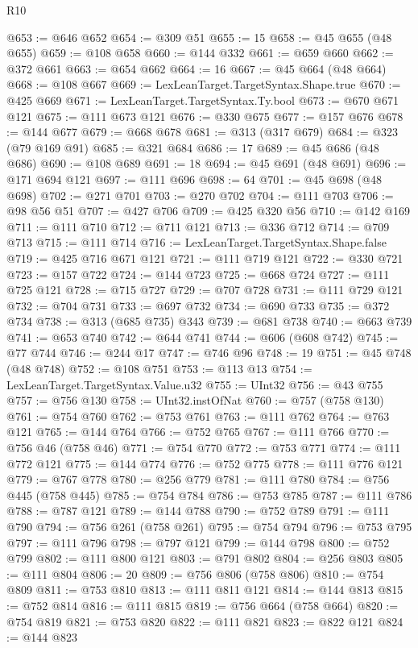 \begin{lexlean}{R10}
\begin{coremodule}
{{{{{{{{{{{{{{{{{{{{{{{{{{{{{{{{{{{{{{{{{{{{{{{{{{{{{{{{{{{{{{{{{{{{{{{{{{{{{{{{{{{{{{{{{{{{{{{{{{{{{{{{{{{{@653 := @646 @652
@654 := @309 @51
@655 := 15
@658 := @45 @655 (@48 @655)
@659 := @108 @658
@660 := @144 @332
@661 := @659 @660
@662 := @372 @661
@663 := @654 @662
@664 := 16
@667 := @45 @664 (@48 @664)
@668 := @108 @667
@669 := LexLeanTarget.TargetSyntax.Shape.true
@670 := @425 @669
@671 := LexLeanTarget.TargetSyntax.Ty.bool
@673 := @670 @671 @121
@675 := @111 @673 @121
@676 := @330 @675
@677 := @157 @676
@678 := @144 @677
@679 := @668 @678
@681 := @313 (@317 @679)
@684 := @323 (@79 @169 @91)
@685 := @321 @684
@686 := 17
@689 := @45 @686 (@48 @686)
@690 := @108 @689
@691 := 18
@694 := @45 @691 (@48 @691)
@696 := @171 @694 @121
@697 := @111 @696
@698 := 64
@701 := @45 @698 (@48 @698)
@702 := @271 @701
@703 := @270 @702
@704 := @111 @703
@706 := @98 @56 @51
@707 := @427 @706
@709 := @425 @320 @56
@710 := @142 @169
@711 := @111 @710
@712 := @711 @121
@713 := @336 @712
@714 := @709 @713
@715 := @111 @714
@716 := LexLeanTarget.TargetSyntax.Shape.false
@719 := @425 @716 @671 @121
@721 := @111 @719 @121
@722 := @330 @721
@723 := @157 @722
@724 := @144 @723
@725 := @668 @724
@727 := @111 @725 @121
@728 := @715 @727
@729 := @707 @728
@731 := @111 @729 @121
@732 := @704 @731
@733 := @697 @732
@734 := @690 @733
@735 := @372 @734
@738 := @313 (@685 @735) @343
@739 := @681 @738
@740 := @663 @739
@741 := @653 @740
@742 := @644 @741
@744 := @606 (@608 @742)
@745 := @77 @744
@746 := @244 @17
@747 := @746 @96
@748 := 19
@751 := @45 @748 (@48 @748)
@752 := @108 @751
@753 := @113 @13
@754 := LexLeanTarget.TargetSyntax.Value.u32
@755 := UInt32
@756 := @43 @755
@757 := @756 @130
@758 := UInt32.instOfNat
@760 := @757 (@758 @130)
@761 := @754 @760
@762 := @753 @761
@763 := @111 @762
@764 := @763 @121
@765 := @144 @764
@766 := @752 @765
@767 := @111 @766
@770 := @756 @46 (@758 @46)
@771 := @754 @770
@772 := @753 @771
@774 := @111 @772 @121
@775 := @144 @774
@776 := @752 @775
@778 := @111 @776 @121
@779 := @767 @778
@780 := @256 @779
@781 := @111 @780
@784 := @756 @445 (@758 @445)
@785 := @754 @784
@786 := @753 @785
@787 := @111 @786
@788 := @787 @121
@789 := @144 @788
@790 := @752 @789
@791 := @111 @790
@794 := @756 @261 (@758 @261)
@795 := @754 @794
@796 := @753 @795
@797 := @111 @796
@798 := @797 @121
@799 := @144 @798
@800 := @752 @799
@802 := @111 @800 @121
@803 := @791 @802
@804 := @256 @803
@805 := @111 @804
@806 := 20
@809 := @756 @806 (@758 @806)
@810 := @754 @809
@811 := @753 @810
@813 := @111 @811 @121
@814 := @144 @813
@815 := @752 @814
@816 := @111 @815
@819 := @756 @664 (@758 @664)
@820 := @754 @819
@821 := @753 @820
@822 := @111 @821
@823 := @822 @121
@824 := @144 @823
}}}}}}}}}}}}}}}}}}}}}}}}}}}}}}}}}}}}}}}}}}}}}}}}}}}}}}}}}}}}}}}}}}}}}}}}}}}}}}}}}}}}}}}}}}}}}}}}}}}}}}}}}}}}
\end{coremodule}
\end{lexlean}
